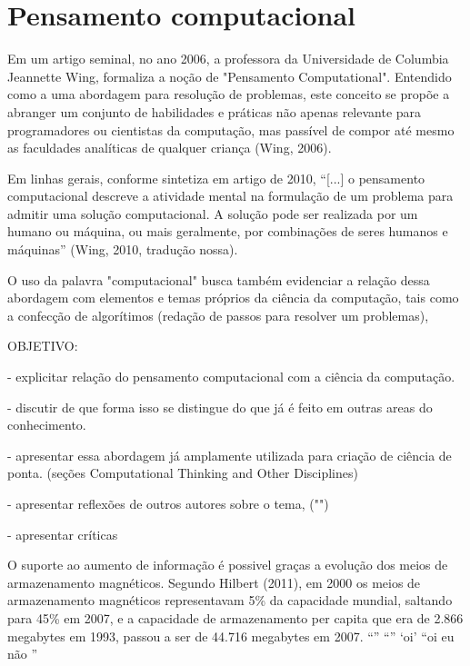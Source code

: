 \documentclass{book}
\begin{document}
\chapter{Pensamento computacional}


Em um artigo seminal, no ano 2006,  a professora da Universidade de Columbia 
Jeannette Wing, formaliza a noção de "Pensamento Computational". Entendido como a uma abordagem para resolução de problemas, este conceito
se propõe a abranger um conjunto de habilidades e práticas não apenas relevante para programadores ou cientistas da computação, mas passível de compor até mesmo as
faculdades analíticas de qualquer criança (Wing, 2006).

Em linhas gerais, conforme sintetiza em artigo de 2010, ``[...] o pensamento 
computacional descreve a atividade mental na formulação de um problema para admitir 
uma solução computacional. A solução pode ser realizada por um humano ou máquina, 
ou mais geralmente, por combinações de seres humanos e máquinas'' (Wing, 2010, tradução nossa).

O uso da palavra "computacional" busca também evidenciar a relação dessa abordagem 
com elementos e temas próprios da ciência da computação, tais como a confecção de algorítimos (redação de passos para resolver um problemas), 


OBJETIVO: 

- explicitar relação do pensamento computacional com a ciência da computação.

- discutir de que forma isso se distingue do que já é feito em outras areas do conhecimento.

- apresentar essa abordagem já amplamente utilizada para criação de ciência de ponta. (seções Computational Thinking and Other Disciplines) 

- apresentar reflexões de outros autores sobre o tema, ("") 

- apresentar críticas

O suporte ao aumento de informação é possivel graças a evolução dos meios de
armazenamento magnéticos. Segundo Hilbert (2011), em 2000 os meios de armazenamento
magnéticos representavam 5\% da capacidade mundial, saltando para 45\% em 2007, e a
capacidade de armazenamento per capita que era de 2.866 megabytes em 1993, passou a ser
de 44.716 megabytes em 2007. 
``''
``''
`oi'
``oi eu não ''
\end{document}
